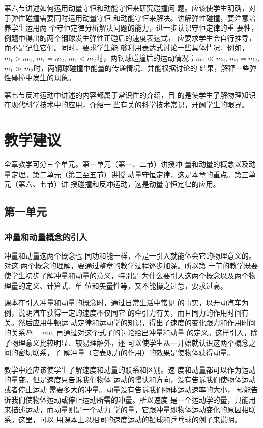 第六节讲述如何运用动量守恒和动能守恒来研究碰撞问
题。应该使学生明确，对于弹性碰撞需要同时运用动量守恒
和动能守恒来解决。讲解弹性碰撞，要注意培养学生运用两
个守恒定律分析解决问题的能力，进一步认识守恒定律的重
要性，例题中得出的两个钢球发生弹性正碰后的速度表达式，
应要求学生会自行推导，而不是记住它们。同时，要求学生能
够利用表达式讨论一些具体情况．例如，$m_1>m_2$, $m_1=m_2$,
$m_1<m_2$时，两钢球碰撞后的运动情况；$m_1\ll m_2$, $m_1=m_2$, 
$m_1\gg m_2$时，两钢球碰撞中能量的传递情况．并能根据讨论的
结果，解释一些弹性碰撞中发生的现象。

第七节反冲运动中讲述的内容都属于常识性的介绍，目
的是使学生了解物理知识在现代科学技术中的应用，介绍一
些有关的科学技术常识，开阔学生的眼界。

\section{教学建议}
全章教学可分三个单元。第一单元（第一、二节）讲授冲
量和动量的概念以及动量定理。第二单元（第三至五节）讲授
动量守恒定律，这是本章的重点。第三单元（第六、七节）讲
授碰撞和反冲运动，这是动量守恒定律的应用。

\subsection{第一单元}
\subsubsection{冲量和动量概念的引入}

冲量和动量这两个概念也
同功和能一样，不是一引入就能体会它的物理意义的。对这
两个概念的理解，要通过整章的教学过程逐步加深。所以第
一节的教学既要使学生初步了解冲量和动量的意义，特别是
为什么要引入这两个概念以及两个物理量的定义、计算式、单
位和矢量性等，又不能操之过急，要求过高。

课本在引入冲量和动量的概念时，通过日常生活中常见
的事实，以开动汽车为例，说明汽车获得一定的速度不仅同它
的牵引力有关，而且同力的作用时间有关。然后应用牛顿运
动定律和运动学的知识，得出了速度的变化跟力和作用时间
的关系$Ft=mv$. 再通过对这个式子的讨论给出冲量和动量
的定义。这样引入，除了物理意义比较明显、较易理解外，还
可以使学生从一开始就认识这两个概念之间的密切联系，了
解冲量（它表现力的作用）的效果是使物体获得动量。

教学中还应该使学生了解速度和动量的联系和区别。速
度和动量都可以作为运动的量变。但是速度只告诉我们物体
运动的慢快和方向，没有告诉我们使物体运动或者停止运动
需要多大的冲量。动量没有告诉我们物体运动速率的大小，
却能告诉我们使物体运动或停止运动所需的冲量。所以速度
是一个运动学的量，只能用来描述运动，而动量则是一个动力
学的量，它跟冲量即物体运动变化的原因相联系。这里，可以
用课本上以相同的速度运动的铅球和乒乓球的例子来说明。

